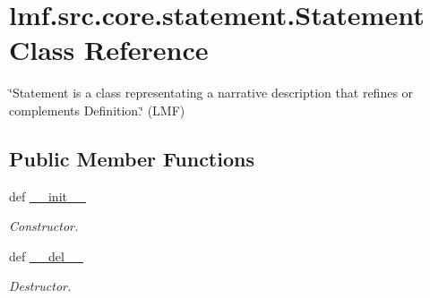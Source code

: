 \hypertarget{classlmf_1_1src_1_1core_1_1statement_1_1_statement}{\section{lmf.\+src.\+core.\+statement.\+Statement Class Reference}
\label{classlmf_1_1src_1_1core_1_1statement_1_1_statement}
}


\char`\"{}\+Statement is a class representating a narrative description that refines or complements Definition.\char`\"{} (L\+M\+F)  


\subsection*{Public Member Functions}
\begin{DoxyCompactItemize}
\item 
def \hyperlink{classlmf_1_1src_1_1core_1_1statement_1_1_statement_ace7d3a3325c7f7b255a3dd72b20c74b1}{\+\_\+\+\_\+init\+\_\+\+\_\+}
\begin{DoxyCompactList}\small\item\em Constructor. \end{DoxyCompactList}\item 
def \hyperlink{classlmf_1_1src_1_1core_1_1statement_1_1_statement_a49d77869667dfde6c6abc794201f9fc3}{\+\_\+\+\_\+del\+\_\+\+\_\+}
\begin{DoxyCompactList}\small\item\em Destructor. \end{DoxyCompactList}\end{DoxyCompactItemize}
